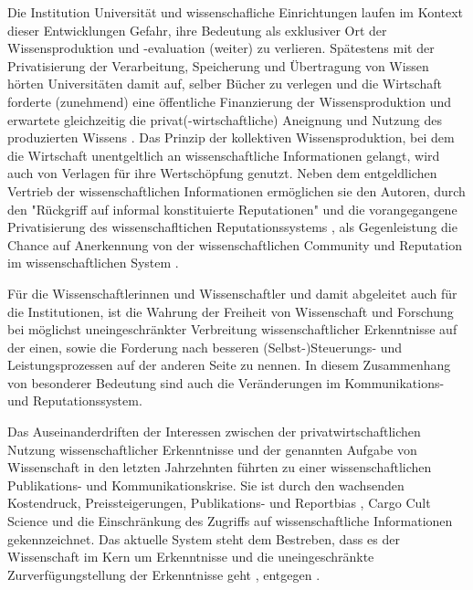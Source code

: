 Die Institution Universität und wissenschafliche Einrichtungen laufen im Kontext dieser Entwicklungen Gefahr, ihre Bedeutung als exklusiver Ort der Wissensproduktion und -evaluation (weiter) zu verlieren. Spätestens mit der Privatisierung der Verarbeitung, Speicherung und Übertragung von Wissen hörten Universitäten damit auf, selber Bücher zu verlegen \cite{cite:0} und die Wirtschaft forderte (zunehmend) eine öffentliche Finanzierung der Wissensproduktion und erwartete gleichzeitig die privat(-wirtschaftliche) Aneignung und Nutzung des produzierten Wissens \cite{cite:2}. Das Prinzip der kollektiven Wissensproduktion, bei dem die Wirtschaft unentgeltlich an wissenschaftliche Informationen gelangt, wird auch von Verlagen für ihre Wertschöpfung genutzt. Neben dem entgeldlichen Vertrieb der wissenschaftlichen Informationen ermöglichen sie den Autoren, durch den "Rückgriff auf informal konstituierte Reputationen" \cite{luhmann_1970_selbststeuerung} und die vorangegangene Privatisierung des wissenschafltichen Reputationssystems \cite{suchen}, als Gegenleistung die Chance auf Anerkennung von der wissenschaftlichen Community und Reputation im wissenschaftlichen System \cite{cite:21a}.

Für die Wissenschaftlerinnen und Wissenschaftler und damit abgeleitet auch für die Institutionen, ist die Wahrung der Freiheit von Wissenschaft und Forschung bei möglichst uneingeschränkter Verbreitung wissenschaftlicher Erkenntnisse \cite{hagner_2015_sache_buches} auf der einen, sowie die Forderung nach besseren (Selbst-)Steuerungs- und Leistungsprozessen \cite{Adler_2009} \cite{gibbons_1994} auf der anderen Seite zu nennen. In diesem Zusammenhang von besonderer Bedeutung sind auch die Veränderungen im Kommunikations- und Reputationssystem.

Das Auseinanderdriften der Interessen zwischen der privatwirtschaftlichen Nutzung wissenschaftlicher Erkenntnisse und der genannten Aufgabe von Wissenschaft in den letzten Jahrzehnten führten zu einer wissenschaftlichen Publikations- und Kommunikationskrise. Sie ist durch den wachsenden Kostendruck, Preissteigerungen, Publikations- \cite{Egger_1997} \cite{Fanelli_2012} \cite{Beverungen_2012} \cite{Brembs_20013} und Reportbias \cite{Chan_2008} \cite{Dickersin_2011}, Cargo Cult Science \cite{Feynman_1974} und die Einschränkung des Zugriffs auf wissenschaftliche Informationen \cite{Hess_2006} gekennzeichnet. Das aktuelle System steht dem Bestreben, dass es der Wissenschaft im Kern um Erkenntnisse und die uneingeschränkte Zurverfügungstellung der Erkenntnisse geht \cite{hanekop_2006}, entgegen \cite{offhaus_2012_institutionelle_repos}.

